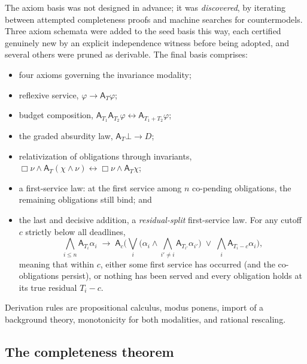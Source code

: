 The axiom basis was not designed in advance; it was
\emph{discovered}, by iterating between attempted completeness proofs
and machine searches for countermodels. Three axiom schemata were
added to the seed basis this way, each certified genuinely new by an
explicit independence witness before being adopted, and several
others were pruned as derivable. The final basis comprises:
\begin{itemize}
\item four axioms governing the invariance modality;
\item reflexive service, $\varphi \to \mathsf{A}_T\varphi$;
\item budget composition,
  $\mathsf{A}_{T_1}\mathsf{A}_{T_2}\varphi \leftrightarrow
  \mathsf{A}_{T_1+T_2}\varphi$;
\item the graded absurdity law, $\mathsf{A}_T\bot \to D$;
\item relativization of obligations through invariants,
  $\Box\nu \wedge \mathsf{A}_T(\chi \wedge \nu) \leftrightarrow
  \Box\nu \wedge \mathsf{A}_T\chi$;
\item a first-service law: at the first service among $n$ co-pending
  obligations, the remaining obligations still bind; and
\item the last and decisive addition, a \emph{residual-split}
  first-service law. For any cutoff $c$ strictly below all deadlines,
  \[
  \bigwedge_{i \le n} \mathsf{A}_{T_i}\alpha_i \;\to\;
  \mathsf{A}_c\Big(\bigvee_{i}\big(\alpha_i \wedge
  \bigwedge_{i' \ne i} \mathsf{A}_{T_{i'}}\alpha_{i'}\big) \;\vee\;
  \bigwedge_i \mathsf{A}_{T_i - c}\alpha_i\Big),
  \]
  meaning that within $c$, either some first service has occurred
  (and the co-obligations persist), or nothing has been served and
  every obligation holds at its true residual $T_i - c$.
\end{itemize}
Derivation rules are propositional calculus, modus ponens, import of
a background theory, monotonicity for both modalities, and rational
rescaling.

\subsection{The completeness theorem}
\label{sec:gnand-theorem}

